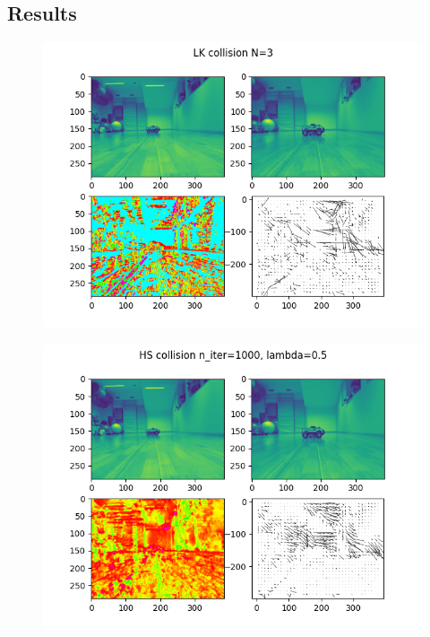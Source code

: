 \documentclass[9pt]{IEEEtran}
\begin{document}
\subsection{Results}
\begin{figure}[h]
    \centering
    \includegraphics[width=1\columnwidth]{collisionlk.png}
    \label{fig:disparitylk}
\end{figure}
\begin{figure}[h]
    \centering
    \includegraphics[width=1\columnwidth]{collisionhs.png}
    \label{fig:disparityhs}
\end{figure}
\end{document}
